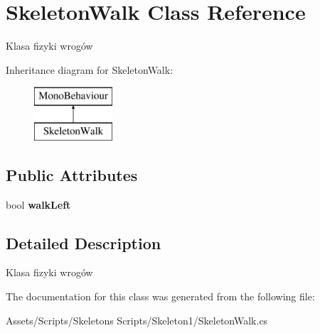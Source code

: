\hypertarget{class_skeleton_walk}{}\section{Skeleton\+Walk Class Reference}
\label{class_skeleton_walk}


Klasa fizyki wrogów  


Inheritance diagram for Skeleton\+Walk\+:\begin{figure}[H]
\begin{center}
\leavevmode
\includegraphics[height=2.000000cm]{class_skeleton_walk}
\end{center}
\end{figure}
\subsection*{Public Attributes}
\begin{DoxyCompactItemize}
\item 
\mbox{\label{class_skeleton_walk_af73af7e0b7abbfc76713ea91b9ad9817}} 
bool {\bfseries walk\+Left}
\end{DoxyCompactItemize}


\subsection{Detailed Description}
Klasa fizyki wrogów 



The documentation for this class was generated from the following file\+:\begin{DoxyCompactItemize}
\item 
Assets/\+Scripts/\+Skeletons Scripts/\+Skeleton1/Skeleton\+Walk.\+cs\end{DoxyCompactItemize}
